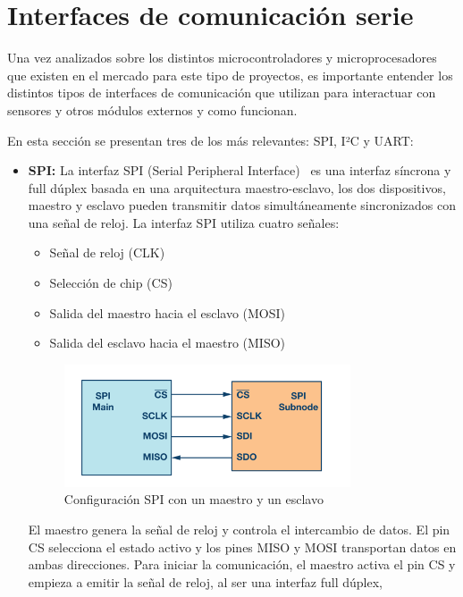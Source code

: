\section{Interfaces de comunicación serie}
Una vez analizados sobre los distintos microcontroladores y microprocesadores que existen en el mercado para este tipo de proyectos,
es importante entender los distintos tipos de interfaces de comunicación que utilizan para interactuar con sensores y otros módulos externos y como funcionan.

En esta sección se presentan tres de los más relevantes: SPI, I²C y UART:

\begin{itemize}
    \item \textbf{SPI:} La interfaz SPI (Serial Peripheral Interface)~\cite{dhaker_spi} es una interfaz síncrona y full dúplex basada en una arquitectura maestro-esclavo,
    los dos dispositivos, maestro y esclavo pueden transmitir datos simultáneamente sincronizados con una señal de reloj.
    La interfaz SPI utiliza cuatro señales:
    \begin{itemize}
        \item Señal de reloj (CLK)
        \item Selección de chip (CS)
        \item Salida del maestro hacia el esclavo (MOSI)
        \item Salida del esclavo hacia el maestro (MISO)
    \end{itemize}
    \begin{figure}[h]
        \centering
        \includegraphics[width=0.8\textwidth]{Imagenes/Bitmap/spi}
        \caption{Configuración SPI con un maestro y un esclavo}
        \label{fig:spi}
    \end{figure}
    El maestro genera la señal de reloj y controla el intercambio de datos.
    El pin CS selecciona el estado activo y los pines MISO y MOSI transportan datos en ambas direcciones.
    Para iniciar la comunicación, el maestro activa el pin CS y empieza a emitir la señal de reloj, al ser una interfaz full dúplex,

\end{itemize}
